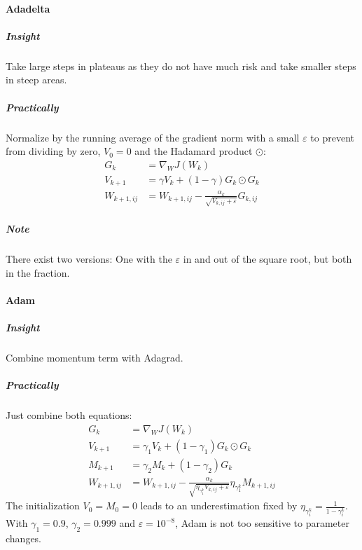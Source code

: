 \paragraph{Adadelta}
\subparagraph{Insight}
Take large steps in plateaus as they do not have much risk and take smaller steps in steep areas.

\subparagraph{Practically}
Normalize by the running average of the gradient norm with a small \(\varepsilon\) to prevent from dividing by zero, \( V_0 = 0 \) and the Hadamard product \( \odot \):
\begin{align}
	G_k           & = \nabla_W J(W_k)                                                           \\
	V_{k + 1}     & = \gamma V_k + (1 - \gamma) G_k \odot G_k                                   \\
	W_{k + 1, ij} & = W_{k + 1, ij} - \frac{\alpha_k}{\sqrt{V_{k, ij} + \varepsilon}} G_{k, ij}
\end{align}

\subparagraph{Note}
	There exist two versions: One with the \(\varepsilon\) in and out of the square root, but both in the fraction.

\paragraph{Adam}
	\subparagraph{Insight}
		Combine momentum term with Adagrad.

		\subparagraph{Practically}
			Just combine both equations:
			\begin{align}
				G_k           & = \nabla_W J(W_k)                                                                                                   \\
				V_{k + 1}     & = \gamma_1 V_k + (1 - \gamma_1) G_k \odot G_k                                                                       \\
				M_{k + 1}     & = \gamma_2 M_k + (1 - \gamma_2) G_k                                                                                 \\
				W_{k + 1, ij} & = W_{k + 1, ij} - \frac{\alpha_k}{\sqrt{\eta_{\gamma_1^k} V_{k, ij} + \varepsilon}} \eta_{\gamma_1^k} M_{k + 1, ij}
			\end{align}
			The initialization \( V_0 = M_0 = 0 \) leads to an underestimation fixed by \( \eta_{\gamma_i^k} = \frac{1}{1 - \gamma_i^k} \). With \( \gamma_1 = 0.9 \), \( \gamma_2 = 0.999 \) and \( \varepsilon = 10^{-8} \), Adam is not too sensitive to parameter changes.

